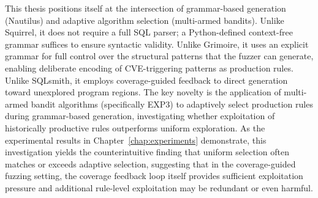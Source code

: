 This thesis positions itself at the intersection of grammar-based generation (Nautilus) and adaptive algorithm selection (multi-armed bandits). Unlike Squirrel, it does not require a full SQL parser; a Python-defined context-free grammar suffices to ensure syntactic validity. Unlike Grimoire, it uses an explicit grammar for full control over the structural patterns that the fuzzer can generate, enabling deliberate encoding of CVE-triggering patterns as production rules. Unlike SQLsmith, it employs coverage-guided feedback to direct generation toward unexplored program regions. The key novelty is the application of multi-armed bandit algorithms (specifically EXP3) to adaptively select production rules during grammar-based generation, investigating whether exploitation of historically productive rules outperforms uniform exploration. As the experimental results in Chapter~\ref{chap:experiments} demonstrate, this investigation yields the counterintuitive finding that uniform selection often matches or exceeds adaptive selection, suggesting that in the coverage-guided fuzzing setting, the coverage feedback loop itself provides sufficient exploitation pressure and additional rule-level exploitation may be redundant or even harmful.
